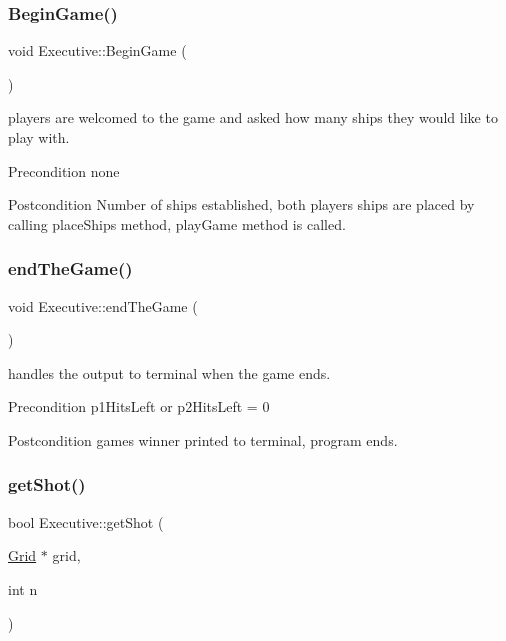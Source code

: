 \subsubsection{\texorpdfstring{Begin\+Game()}{BeginGame()}}
{\footnotesize\ttfamily void Executive\+::\+Begin\+Game (\begin{DoxyParamCaption}{ }\end{DoxyParamCaption})}



players are welcomed to the game and asked how many ships they would like to play with. 

\begin{DoxyPrecond}{Precondition}
none 
\end{DoxyPrecond}
\begin{DoxyPostcond}{Postcondition}
Number of ships established, both player\textquotesingle{}s ships are placed by calling place\+Ships method, play\+Game method is called. 
\end{DoxyPostcond}
\mbox{\label{classExecutive_a7ecea33073bc684a8efdd3bd08f724e3}} 
\subsubsection{\texorpdfstring{end\+The\+Game()}{endTheGame()}}
{\footnotesize\ttfamily void Executive\+::end\+The\+Game (\begin{DoxyParamCaption}{ }\end{DoxyParamCaption})}



handles the output to terminal when the game ends. 

\begin{DoxyPrecond}{Precondition}
p1\+Hits\+Left or p2\+Hits\+Left = 0 
\end{DoxyPrecond}
\begin{DoxyPostcond}{Postcondition}
game\textquotesingle{}s winner printed to terminal, program ends. 
\end{DoxyPostcond}
\mbox{\label{classExecutive_af66dfa4b2bd996fdbcb7159d143a1d89}} 
\subsubsection{\texorpdfstring{get\+Shot()}{getShot()}}
{\footnotesize\ttfamily bool Executive\+::get\+Shot (\begin{DoxyParamCaption}\item[{\hyperlink{classGrid}{Grid} $\ast$}]{grid,  }\item[{int}]{n }\end{DoxyParamCaption})}




